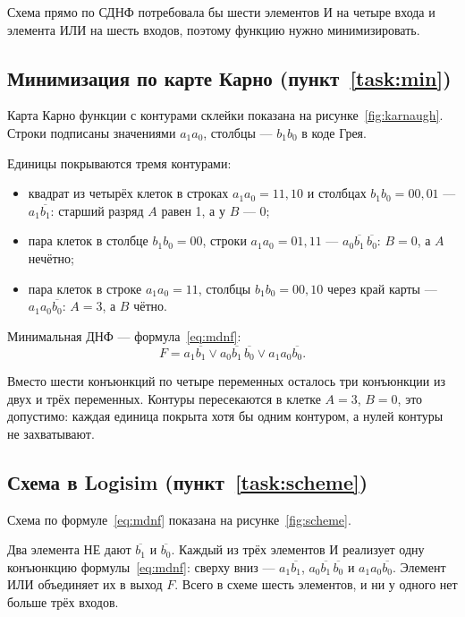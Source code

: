 Схема прямо по СДНФ потребовала бы шести элементов И на четыре входа и элемента ИЛИ на шесть
входов, поэтому функцию нужно минимизировать.

\subsection{Минимизация по карте Карно (пункт~\ref{task:min})}
Карта Карно функции с контурами склейки показана на рисунке~\ref{fig:karnaugh}. Строки
подписаны значениями $a_1 a_0$, столбцы — $b_1 b_0$ в коде Грея.


Единицы покрываются тремя контурами:
\begin{itemize}
  \item квадрат из четырёх клеток в строках $a_1 a_0 = 11, 10$ и столбцах $b_1 b_0 = 00, 01$ —
  $a_1\overline{b_1}$: старший разряд $A$ равен 1, а у $B$ — 0;
  \item пара клеток в столбце $b_1 b_0 = 00$, строки $a_1 a_0 = 01, 11$ —
  $a_0\overline{b_1}\,\overline{b_0}$: $B = 0$, а $A$ нечётно;
  \item пара клеток в строке $a_1 a_0 = 11$, столбцы $b_1 b_0 = 00, 10$ через край карты —
  $a_1 a_0 \overline{b_0}$: $A = 3$, а $B$ чётно.
\end{itemize}
Минимальная ДНФ — формула~\eqref{eq:mdnf}:
\begin{equation}\label{eq:mdnf}
  F = a_1\overline{b_1} \vee a_0\overline{b_1}\,\overline{b_0} \vee a_1 a_0 \overline{b_0}.
\end{equation}

Вместо шести конъюнкций по четыре переменных осталось три конъюнкции из двух и трёх
переменных. Контуры пересекаются в клетке $A = 3$, $B = 0$, это допустимо: каждая единица
покрыта хотя бы одним контуром, а нулей контуры не захватывают.

\subsection{Схема в Logisim (пункт~\ref{task:scheme})}
Схема по формуле~\eqref{eq:mdnf} показана на рисунке~\ref{fig:scheme}.


Два элемента НЕ дают $\overline{b_1}$ и $\overline{b_0}$. Каждый из трёх элементов И
реализует одну конъюнкцию формулы~\eqref{eq:mdnf}: сверху вниз — $a_1\overline{b_1}$,
$a_0\overline{b_1}\,\overline{b_0}$ и $a_1 a_0 \overline{b_0}$. Элемент ИЛИ объединяет их в
выход $F$. Всего в схеме шесть элементов, и ни у одного нет больше трёх входов.

